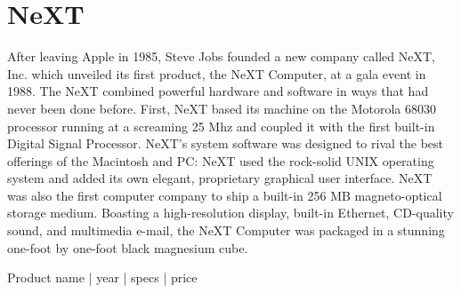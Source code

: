 \section{NeXT}
After leaving Apple in 1985, Steve Jobs founded a new company called NeXT, Inc. which unveiled its first product, the NeXT Computer, at a gala event in 1988. The NeXT combined powerful hardware and software in ways that had never been done before. First, NeXT based its machine on the Motorola 68030 processor running at a screaming 25 Mhz and coupled it with the first built-in Digital Signal Processor.  NeXT's system software was designed to rival the best offerings of the Macintosh and PC: NeXT used the rock-solid UNIX operating system and added its own elegant, proprietary graphical user interface.  NeXT was also the first computer company to ship a built-in 256 MB magneto-optical storage medium.  Boasting a high-resolution display, built-in Ethernet, CD-quality sound, and multimedia e-mail, the NeXT Computer was packaged in a stunning one-foot by one-foot black magnesium cube.\\
\par
Product name | year | specs | price

